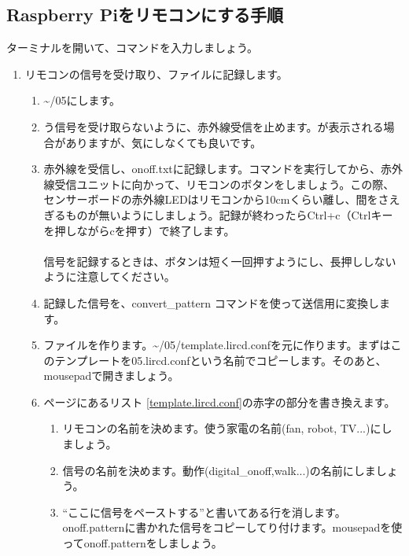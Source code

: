\subsection{Raspberry Piをリモコンにする手順}
\noindent
ターミナルを開いて、コマンドを入力しましょう。
\begin{enumerate}
\item リモコンの信号を受け取り、ファイルに記録します。
 \begin{enumerate}[1]
  \item \textasciitilde /05にします。\\ 
  \item {}う信号を受け取らないように、赤外線受信を止めます。が表示される場合がありますが、気にしなくても良いです。 \\ 
  \item 赤外線を受信し、onoff.txtに記録します。コマンドを実行してから、赤外線受信ユニットに向かって、リモコンのボタンをしましょう。この際、センサーボードの赤外線LEDはリモコンから10cmくらい離し、間をさえぎるものが無いようにしましょう。記録が終わったらCtrl+c（Ctrlキーを押しながらcを押す）で終了します。\\ \\信号を記録するときは、ボタンは短く一回押すようにし、長押ししないように注意してください。
  \item 記録した信号を、convert\_pattern コマンドを使って送信用に変換します。\\ 
  \item {}ファイルを作ります。\textasciitilde /05/template.lircd.confを元に作ります。まずはこのテンプレートを05.lircd.confという名前でコピーします。そのあと、mousepadで開きましょう。\\ 
  \item \pageref{template.lircd.conf}ページにあるリスト \ref{template.lircd.conf}の赤字の部分を書き換えます。
  \begin{enumerate}[(1)]
    \item リモコンの名前を決めます。使う家電の名前(fan, robot, TV...)にしましょう。
    \item 信号の名前を決めます。動作(digital\_onoff,walk...)の名前にしましょう。
    \item “ここに信号をペーストする”と書いてある行を消します。onoff.patternに書かれた信号をコピーしてり付けます。mousepadを使ってonoff.patternをしましょう。\\ 

\end{enumerate}
\end{enumerate}
\end{enumerate}
